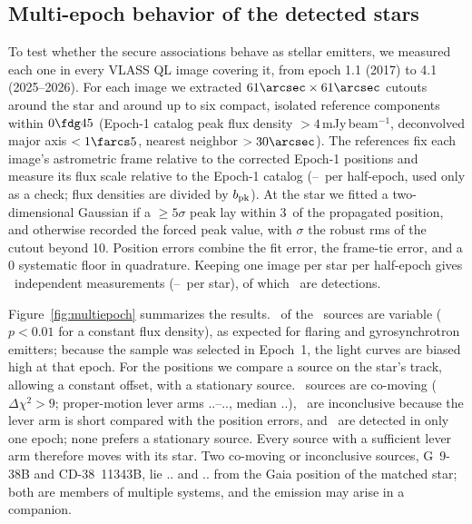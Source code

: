 \documentclass[linenumbers]{aastex702}
\makeatletter
\newcommand{\asec}[1]{\expandafter\asec@i#1..\@nil}
\def\asec@i#1.#2.#3\@nil{\ifx\relax#2\relax#1\arcsec\else#1\farcs#2\fi}
\makeatother
\begin{document}


\subsection{Multi-epoch behavior of the detected stars} \label{sec:multiepoch}

To test whether the secure associations behave as stellar emitters, we measured each one in every VLASS QL image covering it, from epoch 1.1 (2017) to 4.1 (2025--2026). For each image we extracted $61\arcsec\times61\arcsec$ cutouts around the star and around up to six compact, isolated reference components within $0\fdg45$ (Epoch-1 catalog peak flux density $>4$\,mJy\,beam$^{-1}$, deconvolved major axis $<1\farcs5$, nearest neighbor $>30\arcsec$). The references fix each image's astrometric frame relative to the corrected Epoch-1 positions and measure its flux scale relative to the Epoch-1 catalog (\FluxScaleMin--\FluxScaleMax\ per half-epoch, used only as a check; flux densities are divided by $b_{\rm pk}$). At the star we fitted a two-dimensional Gaussian if a $\ge5\sigma$ peak lay within 3\arcsec\ of the propagated position, and otherwise recorded the forced peak value, with $\sigma$ the robust rms of the cutout beyond 10\arcsec. Position errors combine the fit error, the frame-tie error, and a 0 systematic floor in quadrature. Keeping one image per star per half-epoch gives \NMultiImg\ independent measurements (\NImgPerStarMin--\NImgPerStarMax\ per star), of which \NMultiDetImg\ are detections.

Figure~\ref{fig:multiepoch} summarizes the results. \NVariable\ of the \NSecure\ sources are variable ($p<0.01$ for a constant flux density), as expected for flaring and gyrosynchrotron emitters; because the sample was selected in Epoch~1, the light curves are biased high at that epoch. For the positions we compare a source on the star's track, allowing a constant offset, with a stationary source. \NComoving\ sources are co-moving ($\Delta\chi^2>9$; proper-motion lever arms \asec{\LeverMin}--\asec{\LeverMax}, median \asec{\LeverMed}), \NInconclusive\ are inconclusive because the lever arm is short compared with the position errors, and \NSingleDet\ are detected in only one epoch; none prefers a stationary source. Every source with a sufficient lever arm therefore moves with its star. Two co-moving or inconclusive sources, G~9-38B and CD-38~11343B, lie \asec{\GNineOff} and \asec{\CDOff} from the Gaia position of the matched star; both are members of multiple systems, and the emission may arise in a companion.
\end{document}
